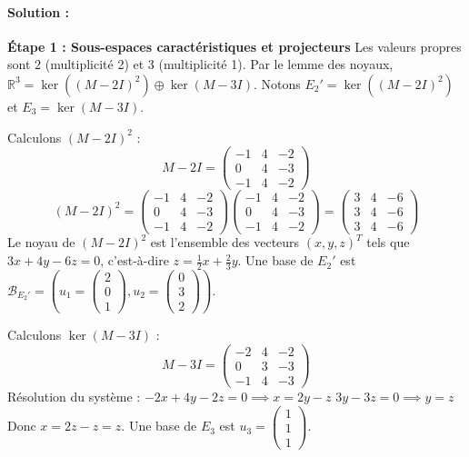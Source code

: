 \documentclass[11pt,a4paper]{article}
\begin{document}
\paragraph*{Solution :}

\textbf{Étape 1 : Sous-espaces caractéristiques et projecteurs}
Les valeurs propres sont $2$ (multiplicité 2) et $3$ (multiplicité 1).
Par le lemme des noyaux, $\mathbb{R}^3 = \ker((M-2I)^2) \oplus \ker(M-3I)$.
Notons $E_2' = \ker((M-2I)^2)$ et $E_3 = \ker(M-3I)$.

Calculons $(M-2I)^2$ :
$$ M - 2I = \begin{pmatrix} -1 & 4 & -2 \\ 0 & 4 & -3 \\ -1 & 4 & -2 \end{pmatrix} $$
$$ (M-2I)^2 = \begin{pmatrix} -1 & 4 & -2 \\ 0 & 4 & -3 \\ -1 & 4 & -2 \end{pmatrix} \begin{pmatrix} -1 & 4 & -2 \\ 0 & 4 & -3 \\ -1 & 4 & -2 \end{pmatrix} = \begin{pmatrix} 3 & 4 & -6 \\ 3 & 4 & -6 \\ 3 & 4 & -6 \end{pmatrix} $$
Le noyau de $(M-2I)^2$ est l'ensemble des vecteurs $(x,y,z)^T$ tels que $3x+4y-6z=0$, c'est-à-dire $z = \frac{1}{2}x + \frac{2}{3}y$.
Une base de $E_2'$ est $\mathcal{B}_{E_2'} = \left( u_1 = \begin{pmatrix} 2 \\ 0 \\ 1 \end{pmatrix}, u_2 = \begin{pmatrix} 0 \\ 3 \\ 2 \end{pmatrix} \right)$.

Calculons $\ker(M-3I)$ :
$$ M - 3I = \begin{pmatrix} -2 & 4 & -2 \\ 0 & 3 & -3 \\ -1 & 4 & -3 \end{pmatrix} $$
Résolution du système :
$-2x+4y-2z = 0 \implies x = 2y-z$
$3y-3z = 0 \implies y=z$
Donc $x = 2z-z = z$.
Une base de $E_3$ est $u_3 = \begin{pmatrix} 1 \\ 1 \\ 1 \end{pmatrix}$.
\end{document}

